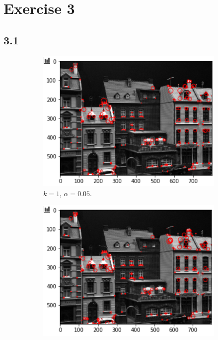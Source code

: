\section{Exercise 3}
\subsection*{3.1}
\begin{figure}[H]
	\centering
	\begin{subfigure}[b]{0.42\linewidth}
		\centering
		\includegraphics[width=\linewidth]{Materials/E3/k1a005}
		\caption{$k = 1$, $\alpha = 0.05$.}
	\end{subfigure}
	\hfill
	\begin{subfigure}[b]{0.42\linewidth}
		\centering
		\includegraphics[width=\linewidth]{Materials/E3/k1a015}

\end{subfigure}
\end{figure}
